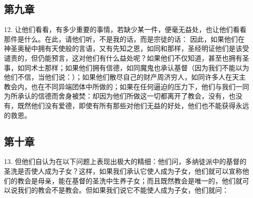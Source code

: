 
\subsection{第九章}

12. 让他们看看，有多少重要的事情，若缺少某一件，便毫无益处，也让他们看看那件是什么。在此，请他们听，不是我的话，而是宗徒的话： 因此，如果他们在神圣奥秘中拥有天使般的言语，又有先知之恩，如同和那样，圣经明证他们是该受谴责的，但仍能预言，这对他们有什么益处呢？如果他们不仅知道，甚至也拥有圣事，如同术士那样；如果他们拥有信德，如同魔鬼也承认基督（因为我们不能以为他们不信，当他们说：）；如果他们散尽自己的财产周济穷人，如同许多人在天主教会内，也在不同异端团体中所做的；如果在任何逼迫的压力下，他们与我们一同为所承认的信德而舍身被焚：却因为他们所做这一切都离开了教会，没有，也没有，既然他们没有爱德，即使有所有那些对他们无益的好处，他们也不能获得永远的救恩。\par


\subsection{第十章}

13. 但他们自认为在以下问题上表现出极大的精细：他们问，多纳徒派中的基督的圣洗是否使人成为子女？这样，如果我们承认它使人成为子女，他们就可以宣称他们的教会是母亲，能在基督的圣洗中生养子女；而且既然教会是唯一的，他们就可以说我们的教会不是教会。但如果我们说它不能使人成为子女，他们就问：\par

